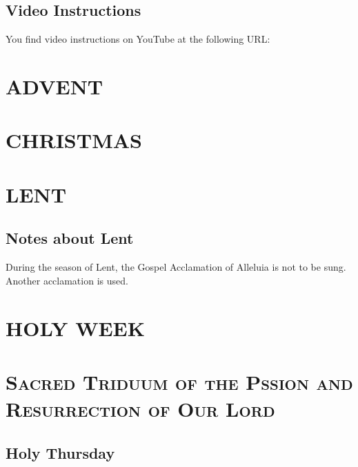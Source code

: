 \documentclass[11pt,oneside]{book} %
\begin{document}
\section{Video Instructions}
\begin{paragraph}
You find video instructions on YouTube at the following URL:
\end{paragraph}

\chapter{ADVENT}




\chapter{CHRISTMAS}



\chapter{LENT}
\section{Notes about Lent}
\begin{paragraph}
During the season of Lent, the Gospel Acclamation of Alleluia is
not to be sung. Another acclamation is used.
\end{paragraph}



\chapter{HOLY WEEK}



\chapter{\textsc{Sacred Triduum of the Pssion and Resurrection of Our Lord}}

\section{Holy Thursday}
\end{document}
